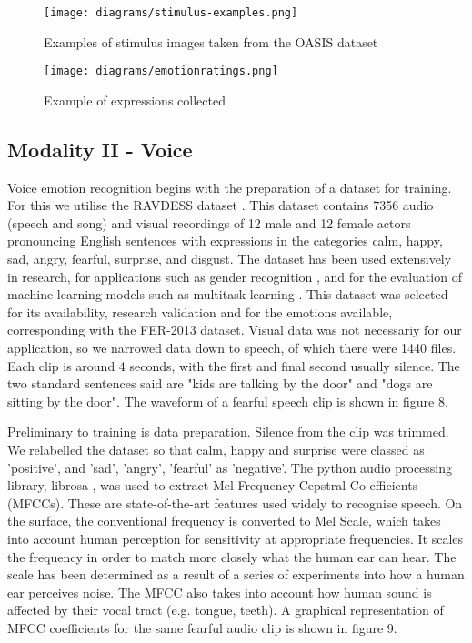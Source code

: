 \documentclass[12pt,a4paper]{article}
\begin{document}
\begin{figure}[h]
	\centerline{\texttt{[image: diagrams/stimulus-examples.png]}}
	\caption{Examples of stimulus images taken from the OASIS dataset}
\end{figure}

\begin{figure}[h]
	\centerline{\texttt{[image: diagrams/emotionratings.png]}}
	\caption{Example of expressions collected}
\end{figure}


\subsection{Modality II - Voice}
Voice emotion recognition begins with the preparation of a dataset for training. For this we utilise the RAVDESS dataset \cite{livingstone2018ryerson}. This dataset contains 7356 audio (speech and song) and visual recordings of 12 male and 12 female actors pronouncing English sentences with expressions in the categories calm, happy, sad, angry, fearful, surprise, and disgust. The dataset has been used extensively in research, for applications such as gender recognition \cite{shegokar2016continuous}, and for the evaluation of machine learning models such as multitask learning \cite{zhang2016cross}. This dataset was selected for its availability, research validation and for the emotions available, corresponding with the FER-2013 dataset. Visual data was not necessariy for our application, so we narrowed data down to speech, of which there were 1440 files. Each clip is around 4 seconds, with the first and final second usually silence. The two standard sentences said are "kids are talking by the door" and "dogs are sitting by the door". The waveform of a fearful speech clip is shown in figure 8.

Preliminary to training is data preparation. Silence from the clip was trimmed. We relabelled the dataset so that calm, happy and surprise were classed as 'positive', and 'sad', 'angry', 'fearful' as 'negative'. The python audio processing library, librosa \cite{brian_mcfee_2020_3955228}, was used to extract Mel Frequency Cepstral Co-efficients (MFCCs). These are state-of-the-art features used widely to recognise speech. On the surface, the conventional frequency is converted to Mel Scale, which takes into account human perception for sensitivity at appropriate frequencies. It scales the frequency in order to match more closely what the human ear can hear. The scale has been determined as a result of a series of experiments into how a human ear perceives noise. The MFCC also takes into account how human sound is affected by their vocal tract (e.g. tongue, teeth). A graphical representation of MFCC coefficients for the same fearful audio clip is shown in figure 9.
\end{document}
